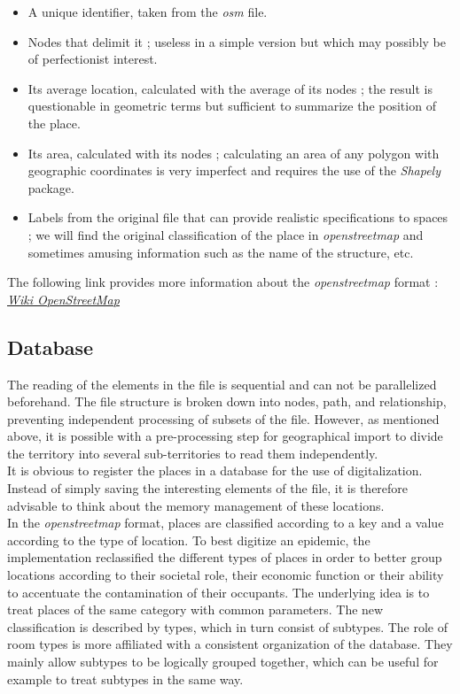 \begin{itemize}
\item A unique identifier, taken from the \textit{osm} file.
\item Nodes that delimit it ; useless in a simple version but which may possibly be of perfectionist interest.
\item Its average location, calculated with the average of its nodes ; the result is questionable in geometric terms but sufficient to summarize the position of the place.
\item Its area, calculated with its nodes ; calculating an area of any polygon with geographic coordinates is very imperfect and requires the use of the \textit{Shapely} package.
\item Labels from the original file that can provide realistic specifications to spaces ; we will find the original classification of the place in \textit{openstreetmap} and sometimes amusing information such as the name of the structure, etc.\\
\end{itemize}


The following link provides more information about the \textit{openstreetmap} format : \href{https://wiki.openstreetmap.org/wiki/FR:\%C3\%89l\%C3\%A9ments\_cartographiques}{\textit{Wiki OpenStreetMap}}\\

\subsection{Database}

The reading of the elements in the file is sequential and can not be parallelized beforehand. The file structure is broken down into nodes, path, and relationship, preventing independent processing of subsets of the file. However, as mentioned above, it is possible with a pre-processing step for geographical import to divide the territory into several sub-territories to read them independently.\\

It is obvious to register the places in a database for the use of digitalization. Instead of simply saving the interesting elements of the file, it is therefore advisable to think about the memory management of these locations.\\

In the \textit{openstreetmap} format, places are classified according to a key and a value according to the type of location. To best digitize an epidemic, the implementation reclassified the different types of places in order to better group locations according to their societal role, their economic function or their ability to accentuate the contamination of their occupants. The underlying idea is to treat places of the same category with common parameters. The new classification is described by types, which in turn consist of subtypes. The role of room types is more affiliated with a consistent organization of the database. They mainly allow subtypes to be logically grouped together, which can be useful for example to treat subtypes in the same way.\\

